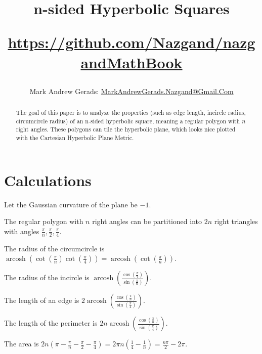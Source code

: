 \documentclass[]{article}
\author{Mark Andrew Gerads: \href{MailTo:MarkAndrewGerads.Nazgand@Gmail.Com}{MarkAndrewGerads.Nazgand@Gmail.Com}}
\title{
	n-sided Hyperbolic Squares
	
	\href{https://github.com/Nazgand/nazgandMathBook}{https://github.com/Nazgand/nazgandMathBook}
}
\DeclareMathOperator{\arcosh}{arcosh}
\newcommand{\pqty}[1]{{\left(#1\right)}}
\numberwithin{equation}{section}
\begin{document}
	
	\maketitle
	
	\begin{abstract}
		The goal of this paper is to analyze the properties (such as edge length, incircle radius, circumcircle radius) of an n-sided hyperbolic square, meaning a regular polygon with $n$ right angles. These polygons can tile the hyperbolic plane, which looks nice plotted with the Cartesian Hyperbolic Plane Metric.
	\end{abstract}
	
	\section{Calculations}
	Let the Gaussian curvature of the plane be $-1$.
	
	The regular polygon with $n$ right angles can be partitioned into $2n$ right triangles with angles $\frac{\pi}{n},\frac{\pi}{2},\frac{\pi}{4}$.
	
	The radius of the circumcircle is $\arcosh\pqty{\cot\pqty{\frac{\pi}{n}}\cot\pqty{\frac{\pi}{4}}}=\arcosh\pqty{\cot\pqty{\frac{\pi}{n}}}$.
	
	The radius of the incircle is
	$\arcosh\pqty{\frac{\cos\pqty{\frac{\pi}{4}}}{\sin\pqty{\frac{\pi}{n}}}}$.
	
	The length of an edge is
	$2\arcosh\pqty{\frac{\cos\pqty{\frac{\pi}{n}}}{\sin\pqty{\frac{\pi}{4}}}}$.
	
	The length of the perimeter is
	$2n\arcosh\pqty{\frac{\cos\pqty{\frac{\pi}{n}}}{\sin\pqty{\frac{\pi}{4}}}}$.
	
	The area is
	$2n\pqty{\pi-\frac{\pi}{n}-\frac{\pi}{2}-\frac{\pi}{4}}=
	2\pi n\pqty{\frac{1}{4}-\frac{1}{n}}=
	\frac{n\pi}{2}-2\pi$.
	
\end{document}
